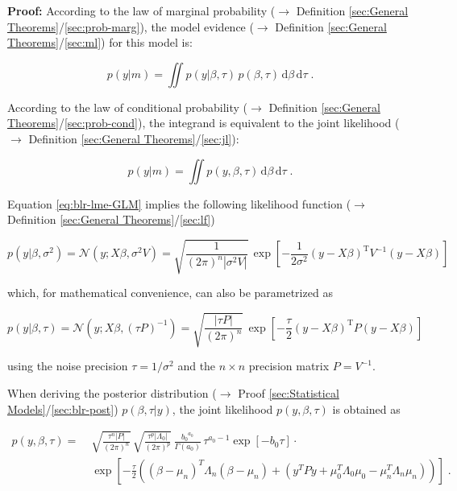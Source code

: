\documentclass[a4paper,12pt,twoside]{book}
\begin{document}
\vspace{1em}
\textbf{Proof:} According to the law of marginal probability ($\rightarrow$ Definition \ref{sec:General Theorems}/\ref{sec:prob-marg}), the model evidence ($\rightarrow$ Definition \ref{sec:General Theorems}/\ref{sec:ml}) for this model is:

\begin{equation} \label{eq:blr-lme-GLM-NG-ME-s1}
p(y|m) = \iint p(y|\beta,\tau) \, p(\beta,\tau) \, \mathrm{d}\beta \, \mathrm{d}\tau \; .
\end{equation}

According to the law of conditional probability ($\rightarrow$ Definition \ref{sec:General Theorems}/\ref{sec:prob-cond}), the integrand is equivalent to the joint likelihood ($\rightarrow$ Definition \ref{sec:General Theorems}/\ref{sec:jl}):

\begin{equation} \label{eq:blr-lme-GLM-NG-ME-s2}
p(y|m) = \iint p(y,\beta,\tau) \, \mathrm{d}\beta \, \mathrm{d}\tau \; .
\end{equation}

Equation \eqref{eq:blr-lme-GLM} implies the following likelihood function ($\rightarrow$ Definition \ref{sec:General Theorems}/\ref{sec:lf})

\begin{equation} \label{eq:blr-lme-GLM-LF-class}
p(y|\beta,\sigma^2) = \mathcal{N}(y; X \beta, \sigma^2 V) = \sqrt{\frac{1}{(2 \pi)^n |\sigma^2 V|}} \, \exp\left[ -\frac{1}{2 \sigma^2} (y-X\beta)^\mathrm{T} V^{-1} (y-X\beta) \right]
\end{equation}

which, for mathematical convenience, can also be parametrized as

\begin{equation} \label{eq:blr-lme-GLM-LF-Bayes}
p(y|\beta,\tau) = \mathcal{N}(y; X \beta, (\tau P)^{-1}) = \sqrt{\frac{|\tau P|}{(2 \pi)^n}} \, \exp\left[ -\frac{\tau}{2} (y-X\beta)^\mathrm{T} P (y-X\beta) \right]
\end{equation}

using the noise precision $\tau = 1/\sigma^2$ and the $n \times n$ precision matrix $P = V^{-1}$.

\vspace{1em}
When deriving the posterior distribution ($\rightarrow$ Proof \ref{sec:Statistical Models}/\ref{sec:blr-post}) $p(\beta,\tau|y)$, the joint likelihood $p(y,\beta,\tau)$ is obtained as

\begin{equation} \label{eq:blr-lme-GLM-NG-LME-s1}
\begin{split}
p(y,\beta,\tau) = \; & \sqrt{\frac{\tau^n |P|}{(2 \pi)^n}} \, \sqrt{\frac{\tau^p |\Lambda_0|}{(2 \pi)^p}} \, \frac{ {b_0}^{a_0}}{\Gamma(a_0)} \, \tau^{a_0-1} \exp[-b_0 \tau] \cdot \\
& \exp\left[ -\frac{\tau}{2} \left( (\beta-\mu_n)^T \Lambda_n (\beta-\mu_n) + (y^T P y + \mu_0^T \Lambda_0 \mu_0 - \mu_n^T \Lambda_n \mu_n) \right) \right] \; .
\end{split}
\end{equation}
\end{document}
